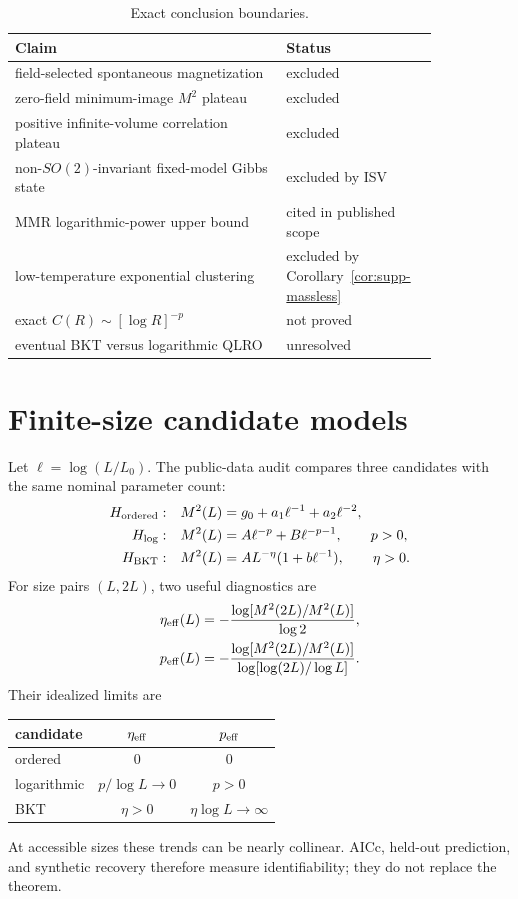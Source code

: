 \documentclass[aps,prb,preprint,notitlepage,groupedaddress,amsmath,amssymb,
               superscriptaddress,nofootinbib,floatfix]{revtex4-2}
\theoremstyle{definition}
\theoremstyle{plain}
\begin{document}
\begin{table}[h]
\caption{Exact conclusion boundaries.}
\begin{ruledtabular}
\begin{tabular}{p{0.58\linewidth}p{0.26\linewidth}}
Claim & Status\\
\hline
field-selected spontaneous magnetization & excluded\\
zero-field minimum-image $M^2$ plateau & excluded\\
positive infinite-volume correlation plateau & excluded\\
non-$SO(2)$-invariant fixed-model Gibbs state & excluded by ISV\\
MMR logarithmic-power upper bound & cited in published scope\\
low-temperature exponential clustering & excluded by
Corollary~\ref{cor:supp-massless}\\
exact $C(R)\sim[\log R]^{-p}$ & not proved\\
eventual BKT versus logarithmic QLRO & unresolved\\
\end{tabular}
\end{ruledtabular}
\end{table}

\section{Finite-size candidate models}

Let $\ell=\log(L/L_0)$.  The public-data audit compares three candidates
with the same nominal parameter count:
\begin{align}
 H_{\rm ordered}:\quad&
 M^2(L)=g_0+a_1\ell^{-1}+a_2\ell^{-2},\\
 H_{\log}:\quad&
 M^2(L)=A\ell^{-p}+B\ell^{-p-1},\qquad p>0,\\
 H_{\rm BKT}:\quad&
 M^2(L)=AL^{-\eta}(1+b\ell^{-1}),\qquad\eta>0.
 \label{eq:supp-models}
\end{align}
For size pairs $(L,2L)$, two useful diagnostics are
\begin{align}
 \eta_{\rm eff}(L)
 &=-\frac{\log[M^2(2L)/M^2(L)]}{\log2},\\
 p_{\rm eff}(L)
 &=-\frac{\log[M^2(2L)/M^2(L)]}
 {\log[\log(2L)/\log L]}.
\end{align}
Their idealized limits are
\begin{center}
\begin{tabular}{lcc}
\toprule
candidate & $\eta_{\rm eff}$ & $p_{\rm eff}$\\
\midrule
ordered & $0$ & $0$\\
logarithmic & $p/\log L\to0$ & $p>0$\\
BKT & $\eta>0$ & $\eta\log L\to\infty$\\
\bottomrule
\end{tabular}
\end{center}
At accessible sizes these trends can be nearly collinear.  AICc, held-out
prediction, and synthetic recovery therefore measure identifiability; they
do not replace the theorem.
\end{document}

